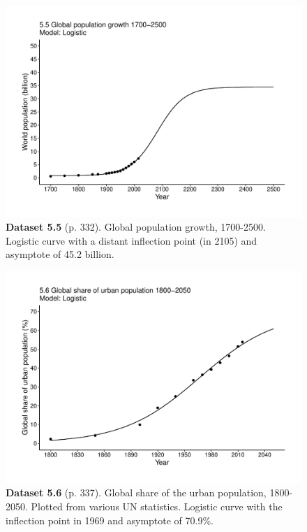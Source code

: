 \documentclass[aps,rmp,preprint,superscriptaddress,10pt,onecolumn]{article}
\begin{document}
\clearpage
\begin{figure}[h]
\includegraphics[width=\textwidth]{output/figs-ggplot/5.5.pdf}
\caption*{\textbf{Dataset 5.5} (p. 332). Global population growth, 1700-2500. Logistic curve with a distant inflection point (in 2105) and asymptote of 45.2 billion. }
\end{figure}
	
\clearpage
\begin{figure}[h]
\includegraphics[width=\textwidth]{output/figs-ggplot/5.6.pdf}
\caption*{\textbf{Dataset 5.6} (p. 337). Global share of the urban population, 1800-2050. Plotted from various UN statistics. Logistic curve with the inflection point in 1969 and asymptote of 70.9\%.}
\end{figure}
	
\end{document}
